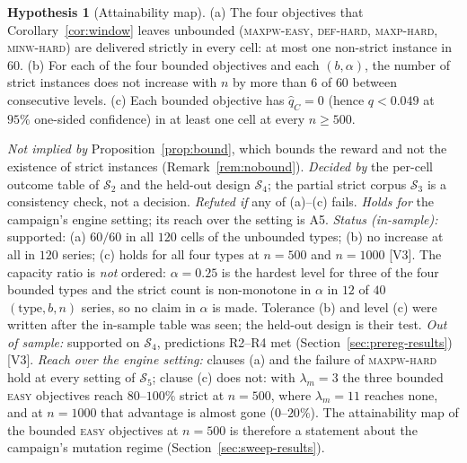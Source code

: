 \documentclass[a4paper,11pt]{article}
\newcommand{\DEF}{\textsc{def}}
\newcommand{\MAXP}{\textsc{maxp}}
\newcommand{\MAXPW}{\textsc{maxpw}}
\newcommand{\MINW}{\textsc{minw}}
\newcommand{\evid}[1]{\textcolor{inkSoft}{\scriptsize[#1]}}
\theoremstyle{plain}
\theoremstyle{definition}
\newtheorem{hypothesis}{Hypothesis}
\theoremstyle{remark}
\begin{document}
\begin{hypothesis}[Attainability map]\label{h:map}
(a) The four objectives that Corollary~\ref{cor:window} leaves unbounded (\MAXPW-\textsc{easy},
\DEF-\textsc{hard}, \MAXP-\textsc{hard}, \MINW-\textsc{hard}) are delivered strictly in every
cell: at most one non-strict instance in $60$.
(b) For each of the four bounded objectives and each $(b,\alpha)$, the number of strict
instances does not increase with $n$ by more than $6$ of $60$ between consecutive levels.
(c) Each bounded objective has $\hat q_C=0$ (hence $q<0.049$ at $95\%$ one-sided confidence)
in at least one cell at every $n\ge500$.
\par\emph{Not implied by} Proposition~\ref{prop:bound}, which bounds the reward and not the
existence of strict instances (Remark~\ref{rem:nobound}).
\emph{Decided by} the per-cell outcome table of $\mathcal S_2$ and the held-out design
$\mathcal S_4$; the partial strict corpus $\mathcal S_3$ is a consistency check, not a
decision. \emph{Refuted if} any of (a)--(c) fails.
\emph{Holds for} the campaign's engine setting; its reach over the setting is A5.
\emph{Status (in-sample):} supported: (a) $60/60$ in all $120$ cells of the unbounded types;
(b) no increase at all in $120$ series; (c) holds for all four types at $n=500$ and
$n=1000$ \evid{V3}. The capacity ratio is \emph{not} ordered: $\alpha=0.25$ is the hardest
level for three of the four bounded types and the strict count is non-monotone in $\alpha$ in
$12$ of $40$ $(\text{type},b,n)$ series, so no claim in $\alpha$ is made. Tolerance (b) and
level (c) were written after the in-sample table was seen; the held-out design is their test.
\emph{Out of sample:} supported on $\mathcal S_4$, predictions R2--R4 met
(Section~\ref{sec:prereg-results}) \evid{V3}.
\emph{Reach over the engine setting:} clauses (a) and the failure of \MAXPW-\textsc{hard} hold
at every setting of $\mathcal S_5$; clause (c) does not: with $\lambda_m=3$ the three bounded
\textsc{easy} objectives reach $80$--$100\%$ strict at $n=500$, where $\lambda_m=11$ reaches
none, and at $n=1000$ that advantage is almost gone ($0$--$20\%$). The attainability map of
the bounded \textsc{easy} objectives at $n=500$ is therefore a statement about the campaign's
mutation regime (Section~\ref{sec:sweep-results}).
\end{hypothesis}
\end{document}

